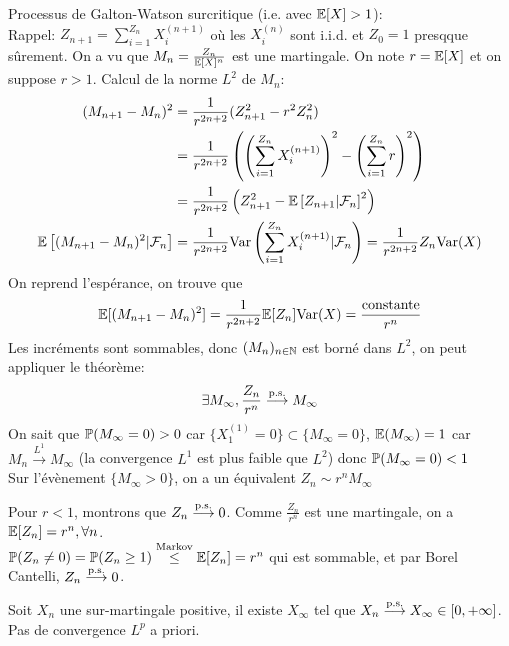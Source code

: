 \documentclass[]{report}
\begin{document}
    \begin{ex}{}{}
        Processus de Galton-Watson surcritique (i.e. avec $\mathbb{E}[X]>1$):\\
        Rappel: $Z_{n+1}=\sum_{i=1}^{Z_n} X_i^{(n+1)}$ où les $X_i^{(n)}$ sont i.i.d. et $Z_0=1$ presqque sûrement. On a vu que $M_n=\frac{Z_n}{\mathbb{E}[X]^n}$ est une martingale. On note $r=\mathbb{E}[X]$ et on suppose $r>1$. Calcul de la norme $L^2$ de $M_n$:
        \begin{align*}
            (M_{n+1}-M_n)^2&=\frac{1}{r^{2n+2}}(Z_{n+1}^2-r^2Z_n^2)\\
            &=\frac{1}{r^{2n+2}}\left(\left(\sum_{i=1}^{Z_n}X_i^{(n+1)}\right)^2-\left(\sum_{i=1}^{Z_n}r\right)^2\right)\\
            &= \frac{1}{r^{2n+2}}\left(Z_{n+1}^2-\mathbb{E}\left[Z_{n+1} |\mathcal{F}_n\right]^2\right)\\
            \mathbb{E}\left[(M_{n+1}-M_n)^2|\mathcal{F}_n\right]&=\frac{1}{r^{2n+2}}\text{Var}\left(\sum_{i=1}^{Z_n}X_i^{(n+1)}|\mathcal{F}_n\right)=\frac{1}{r^{2n+2}}Z_n\text{Var}(X)
        \end{align*}
        On reprend l'espérance, on trouve que
        \begin{align*}
            \mathbb{E}[(M_{n+1}-M_n)^2]=\frac{1}{r^{2n+2}}\mathbb{E}[Z_n]\text{Var}(X)=\frac{\text{constante}}{r^n}
        \end{align*}
        Les incréments sont sommables, donc $(M_n)_{n\in\mathbb{N}}$ est borné dans $L^2$, on peut appliquer le théorème:
        \[\exists M_\infty,\frac{Z_n}{r^n}\overset{\text{p.s.}}{\longrightarrow} M_\infty\] 
        On sait que $\mathbb{P}(M_\infty=0)>0$ car $\{X_1^{(1)}=0\}\subset \{M_{\infty}=0\}$, $\mathbb{E}(M_{\infty})=1$ car $M_n \overset{L^1}{\longrightarrow}M_\infty$ (la convergence $L^1$ est plus faible que $L^2$) donc $\mathbb{P}(M_\infty=0)<1$\\
        Sur l'évènement $\{M_\infty>0\}$, on a un équivalent $Z_n \sim r^n M_{\infty}$
    \end{ex}

    \begin{re}{}{}
        Pour $r<1$, montrons que $Z_n\overset{\text{p.s.}}{\longrightarrow} 0$. Comme $\frac{Z_n}{r^n}$ est une martingale, on a $\mathbb{E}[Z_n]=r^{n},\forall n$.\\
        $\mathbb{P}(Z_n\neq 0)=\mathbb{P}(Z_n\ge 1)\overset{\text{Markov}}{\le}\mathbb{E}[Z_n]=r^n$ qui est sommable, et par Borel Cantelli, $Z_n\overset{\text{p.s.}}{\longrightarrow} 0$.
    \end{re}

    \begin{tm}{}{}
        Soit $X_n$ une sur-martingale positive, il existe $X_\infty$ tel que $X_n\overset{\text{p.s.}}{\longrightarrow} X_\infty\in \left[0,+\infty\right]$.\\
        \danger Pas de convergence $L^p$ a priori.
    \end{tm}
\end{document}
